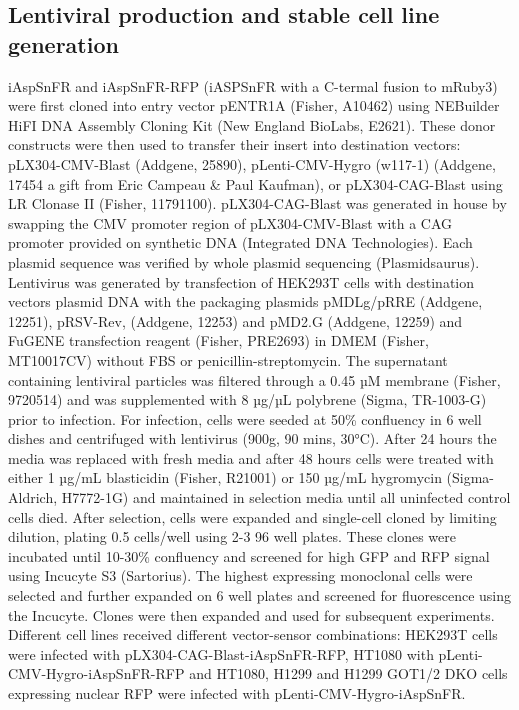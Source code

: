 \documentclass[9pt,lineno]{elife}
\begin{document}
\subsection{Lentiviral production and stable cell line generation}
iAspSnFR and iAspSnFR-RFP (iASPSnFR with a C-termal fusion to mRuby3) were first cloned into entry vector pENTR1A (Fisher, A10462) using NEBuilder HiFI DNA Assembly Cloning Kit (New England BioLabs, E2621).
These donor constructs were then used to transfer their insert into destination vectors: pLX304-CMV-Blast (Addgene, 25890), pLenti-CMV-Hygro (w117-1) (Addgene, 17454 a gift from Eric Campeau \& Paul Kaufman), or pLX304-CAG-Blast using LR Clonase II (Fisher, 11791100).
pLX304-CAG-Blast was generated in house by swapping the CMV promoter region of pLX304-CMV-Blast with a CAG promoter provided on synthetic DNA (Integrated DNA Technologies).
Each plasmid sequence was verified by whole plasmid sequencing (Plasmidsaurus).
Lentivirus was generated by transfection of HEK293T cells with destination vectors plasmid DNA with the packaging plasmids pMDLg/pRRE (Addgene, 12251), pRSV-Rev, (Addgene, 12253) and pMD2.G (Addgene, 12259) and FuGENE transfection reagent (Fisher, PRE2693) in DMEM (Fisher, MT10017CV) without FBS or penicillin-streptomycin.
The supernatant containing lentiviral particles was filtered through a 0.45 µM membrane (Fisher, 9720514) and was supplemented with 8 µg/µL polybrene (Sigma, TR-1003-G) prior to infection.
For infection, cells were seeded at 50\% confluency in 6 well dishes and centrifuged with lentivirus (900g, 90 mins, 30°C).
After 24 hours the media was replaced with fresh media and after 48 hours cells were treated with either 1 µg/mL blasticidin (Fisher, R21001) or 150 µg/mL hygromycin (Sigma-Aldrich, H7772-1G) and maintained in selection media until all uninfected control cells died.
After selection, cells were expanded and single-cell cloned by limiting dilution, plating 0.5 cells/well using 2-3 96 well plates.
These clones were incubated until 10-30\% confluency and screened for high GFP and RFP signal using Incucyte S3 (Sartorius).
The highest expressing monoclonal cells were selected and further expanded on 6 well plates and screened for fluorescence using the Incucyte.
Clones were then expanded and used for subsequent experiments.
Different cell lines received different vector-sensor combinations: HEK293T cells were infected with pLX304-CAG-Blast-iAspSnFR-RFP, HT1080 with pLenti-CMV-Hygro-iAspSnFR-RFP and HT1080, H1299 and H1299 GOT1/2 DKO cells expressing nuclear RFP were infected with pLenti-CMV-Hygro-iAspSnFR.
\end{document}
